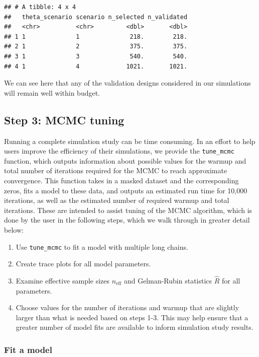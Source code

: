 \documentclass[
]{article}
\begin{document}
\begin{verbatim}
## # A tibble: 4 x 4
##   theta_scenario scenario n_selected n_validated
##   <chr>          <chr>         <dbl>       <dbl>
## 1 1              1              218.        218.
## 2 1              2              375.        375.
## 3 1              3              540.        540.
## 4 1              4             1021.       1021.
\end{verbatim}

\linespread{1}

We can see here that any of the validation designs considered in our simulations will remain well within budget.

\subsection{\texorpdfstring{Step 3: MCMC tuning \label{tune}}{Step 3: MCMC tuning }}\label{step-3-mcmc-tuning}

Running a complete simulation study can be time consuming. In an effort to help users improve the efficiency of their simulations, we provide the \texttt{tune\_mcmc} function, which outputs information about possible values for the warmup and total number of iterations required for the MCMC to reach approximate convergence. This function takes in a masked dataset and the corresponding zeros, fits a model to these data, and outputs an estimated run time for 10,000 iterations, as well as the estimated number of required warmup and total iterations. These are intended to assist tuning of the MCMC algorithm, which is done by the user in the following steps, which we walk through in greater detail below:

\begin{enumerate}
\def\labelenumi{\arabic{enumi}.}
\item
  Use \texttt{tune\_mcmc} to fit a model with multiple long chains.
\item
  Create trace plots for all model parameters.
\item
  Examine effective sample sizes \(n_\text{eff}\) and Gelman-Rubin statistics \(\hat{R}\) for all parameters.
\item
  Choose values for the number of iterations and warmup that are slightly larger than what is needed based on steps 1-3. This may help ensure that a greater number of model fits are available to inform simulation study results.
\end{enumerate}

\subsubsection{Fit a model}\label{fit-a-model}
\end{document}
